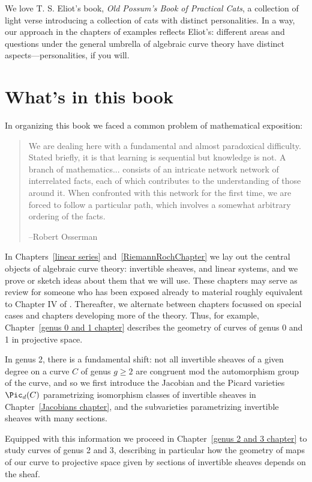 We love T. S. Eliot's book, \emph{Old Possum's Book of Practical Cats}, a collection of light verse introducing a collection of cats with distinct personalities. In a way, our approach in the chapters of examples reflects Eliot's: different areas and questions under the general umbrella of algebraic curve theory have distinct aspects---personalities, if you will.


\section{What's in this book}
In organizing this book we faced a common problem of  mathematical exposition:
\begin{quote}
\small\sf
We are dealing here with a fundamental and almost paradoxical difficulty. Stated briefly, it is that learning is sequential but knowledge is not. A branch of mathematics... consists of an intricate network network of interrelated facts, each of which contributes to the understanding of those around it. When confronted with this network for the first time, we are forced to follow a particular path, which involves a somewhat arbitrary ordering of the facts.

--Robert Osserman\cite{Poetry of the Universe??}

\end{quote}

In Chapters~\ref{linear series} and~\ref{RiemannRochChapter} we lay out the central objects of algebraic curve theory: invertible sheaves, and linear systems, and we prove or sketch ideas about them that we will use. These chapters may serve as review for someone who has been exposed already to material roughly equivalent to Chapter IV of \cite{Hartshorne1977}. Thereafter, we alternate between chapters focussed on special cases and chapters developing more of the theory. Thus, for example, Chapter~\ref{genus 0 and 1 chapter} describes the geometry of curves of genus 0 and 1 in projective space. 

In genus 2, there is a fundamental shift: not all invertible sheaves of a given degree on a curve $C$ of genus $g \geq 2$ are congruent mod the automorphism group of the curve, and so we first introduce the Jacobian and the Picard varieties $\Pic_d(C)$ parametrizing isomorphism classes of invertible sheaves in Chapter~\ref{Jacobians chapter}, and the subvarieties parametrizing invertible sheaves with many sections.

Equipped with this information we proceed in Chapter~\ref{genus 2 and 3 chapter} to study curves of genus 2 and 3, describing in particular how the geometry of maps of our curve to projective space given by sections of invertible sheaves depends on the sheaf. 

